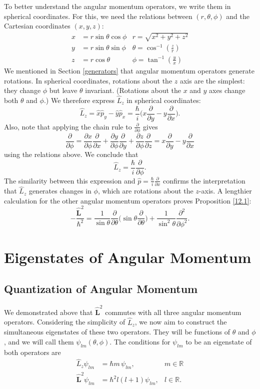 To better understand the angular momentum operators, we write them in spherical coordinates. For this, we need the relations between $(r,\theta,\phi)$ and the Cartesian coordinates $(x,y,z)$: \begin{align*}x&= r\sin\theta\cos\phi  &r= \sqrt{x^2+y^2+z^2}\\ y&=r\sin\theta\sin\phi &\theta=\cos^{-1}(\frac{z}{r}) \\ z&=r\cos\theta &\phi=\tan^{-1}(\frac{y}{x})\end{align*}We mentioned in Section \ref{generators} that angular momentum operators generate rotations. In spherical coordinates, rotations about the $z$ axis are the simplest: they change $\phi$ but leave $\theta$ invariant. (Rotations about the $x$ and $y$ axes change both $\theta$ and $\phi$.) We therefore express $\hat{L}_z$ in spherical coordinates: $$\hat{L}_z=\hat{x}\hat{p}_y-\hat{y}\hat{p}_x=\frac{\hbar}{i}\bigg(x\frac{\partial}{\partial y}-y\frac{\partial}{\partial x}\bigg).$$Also, note that applying the chain rule to $\frac{\partial}{\partial \phi}$ gives $$\frac{\partial}{\partial\phi}=\frac{\partial x}{\partial\phi}\frac{\partial}{\partial x}+\frac{\partial y}{\partial\phi}\frac{\partial}{\partial y}+\frac{\partial z}{\partial\phi}\frac{\partial}{\partial z}=x\frac{\partial}{\partial y}-y\frac{\partial}{\partial x}$$using the relations above. We conclude that $$\boxed{\hat{L}_z=\frac{\hbar}{i}\frac{\partial}{\partial\phi}.}$$The similarity between this expression and $\hat{p}=\frac{\hbar}{i}\frac{\partial}{\partial x}$ confirms the interpretation that $\hat{L}_z$ generates changes in $\phi$, which are rotations about the $z$-axis. A lengthier calculation for the other angular momentum operators proves Proposition \ref{12.1}: $$-\frac{\hat{\mathbf{L}}^2}{\hbar^2}=\frac{1}{\sin\theta}\frac{\partial}{\partial\theta}\bigg(\sin\theta\frac{\partial}{\partial\theta}\bigg)+\frac{1}{\sin^2\theta}\frac{\partial^2}{\partial\phi^2}.$$

\section{Eigenstates of Angular Momentum}
\subsection{Quantization of Angular Momentum}\label{quantization_angular_momentum}

We demonstrated above that $\hat{\mathbf{L}}^2$ commutes with all three angular momentum operators. Considering the simplicity of $\hat{L}_z$, we now aim to construct the simultaneous eigenstates of these two operators. They will be functions of $\theta$ and $\phi$, and we will call them $\psi_{lm}(\theta,\phi)$. The conditions for $\psi_{lm}$ to be an eigenstate of both operators are \begin{align*}\hat{L}_z\psi_{lm}&=\hbar m\,\psi_{lm},&m\in\mathbb{R}\\ \hat{\mathbf{L}}^2\psi_{lm}&=\hbar^2l(l+1)\psi_{lm},& l\in\mathbb{R}.\end{align*}

